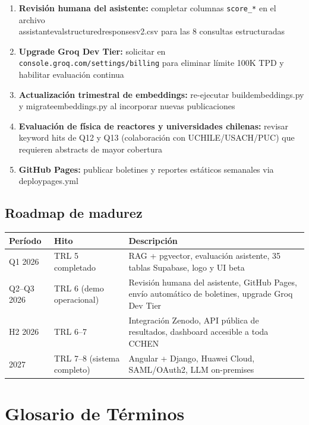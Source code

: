 \documentclass[12pt,a4paper]{report}
\newcommand{\filebreak}{\char95\allowbreak}
\newcommand{\file}[1]{{\color{cchenblue}\ttfamily\let\_\filebreak #1}}
\begin{document}
\begin{enumerate}[leftmargin=2cm]
  \item \textbf{Revisión humana del asistente:} completar columnas \texttt{score\_*} en el archivo \\ \file{assistant\_eval\_structured\_responses\_v2.csv} para las 8 consultas estructuradas
  \item \textbf{Upgrade Groq Dev Tier:} solicitar en \texttt{console.groq.com/settings/billing} para eliminar límite 100K TPD y habilitar evaluación continua
  \item \textbf{Actualización trimestral de embeddings:} re-ejecutar \file{build\_embeddings.py} y \file{migrate\_embeddings.py} al incorporar nuevas publicaciones
  \item \textbf{Evaluación de física de reactores y universidades chilenas:} revisar keyword hits de Q12 y Q13 (colaboración con UCHILE/USACH/PUC) que requieren abstracts de mayor cobertura
  \item \textbf{GitHub Pages:} publicar boletines y reportes estáticos semanales via \file{deploy\_pages.yml}
\end{enumerate}

\section{Roadmap de madurez}

\begin{center}
\begin{tabular}{L{2.5cm} L{5cm} L{6cm}}
  \toprule
  \textbf{Período} & \textbf{Hito} & \textbf{Descripción} \\
  \midrule
  Q1 2026 & TRL 5 completado & RAG + pgvector, evaluación asistente, 35 tablas Supabase, logo y UI beta \\
  Q2--Q3 2026 & TRL 6 (demo operacional) & Revisión humana del asistente, GitHub Pages, envío automático de boletines, upgrade Groq Dev Tier \\
  H2 2026 & TRL 6--7 & Integración Zenodo, API pública de resultados, dashboard accesible a toda CCHEN \\
  2027 & TRL 7--8 (sistema completo) & Angular + Django, Huawei Cloud, SAML/OAuth2, LLM on-premises \\
  \bottomrule
\end{tabular}
\end{center}

\chapter{Glosario de Términos}
\end{document}
